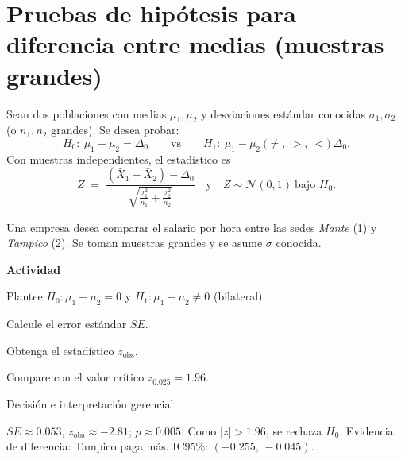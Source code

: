 
\section{Pruebas de hipótesis para diferencia entre medias (muestras grandes)}

Sean dos poblaciones con medias $\mu_1,\mu_2$ y desviaciones estándar conocidas $\sigma_1,\sigma_2$ (o $n_1,n_2$ grandes). Se desea probar:
\[
H_0:\ \mu_1-\mu_2=\Delta_0 \qquad\text{vs}\qquad
H_1:\ \mu_1-\mu_2 \ \text{(}\neq,\ >,\ <\text{)}\ \Delta_0.
\]
Con muestras independientes, el estadístico es
\[
Z \;=\; \frac{(\bar X_1-\bar X_2)-\Delta_0}{\sqrt{\frac{\sigma_1^2}{n_1}+\frac{\sigma_2^2}{n_2}}}
\quad\text{y}\quad Z\sim\mathcal N(0,1)\ \text{bajo }H_0.
\]

\begin{ejercicio}
Una empresa desea comparar el salario por hora entre las sedes \textit{Mante} (1) y \textit{Tampico} (2). Se toman muestras grandes y se asume $\sigma$ conocida.


\textbf{Actividad}
\begin{pasos}
  \item Plantee $H_0:\mu_1-\mu_2=0$ y $H_1:\mu_1-\mu_2\neq 0$ (bilateral).
  \item Calcule el error estándar $SE$.
  \item Obtenga el estadístico $z_{\text{obs}}$.
  \item Compare con el valor crítico $z_{0.025}=1.96$.
  \item Decisión e interpretación gerencial.
\end{pasos}

\begin{clave}
$SE\approx 0.053$, $z_{\text{obs}}\approx -2.81$; $p\approx 0.005$.
Como $|z|>1.96$, se rechaza $H_0$. Evidencia de diferencia: Tampico paga más.
IC95\%: $(-0.255,\,-0.045)$.
\end{clave}
\end{ejercicio}

